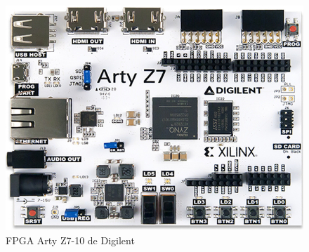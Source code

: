 	\begin{figure}[h]
	\centering
		\includegraphics[scale=.55]{./Figures/FPGA}
		\caption{FPGA Arty Z7-10 de Digilent}
	\label{fig:FPGA}	
	\end{figure}			
			
